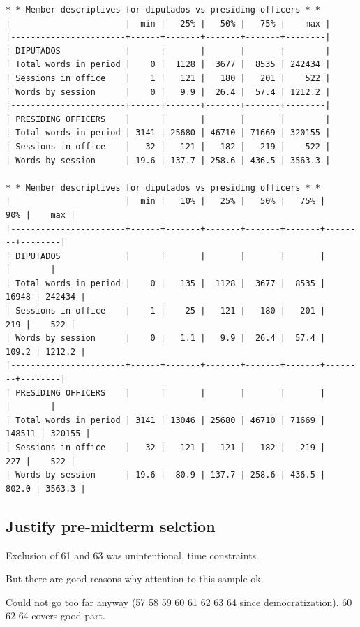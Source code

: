 \documentclass[letter,12pt]{article}
\begin{document}
\singlespacing
\begin{footnotesize}
\begin{verbatim}
* * Member descriptives for diputados vs presiding officers * *
|                       |  min |   25% |   50% |   75% |    max |
|-----------------------+------+-------+-------+-------+--------|
| DIPUTADOS             |      |       |       |       |        |
| Total words in period |    0 |  1128 |  3677 |  8535 | 242434 |
| Sessions in office    |    1 |   121 |   180 |   201 |    522 |
| Words by session      |    0 |   9.9 |  26.4 |  57.4 | 1212.2 |
|-----------------------+------+-------+-------+-------+--------|
| PRESIDING OFFICERS    |      |       |       |       |        |
| Total words in period | 3141 | 25680 | 46710 | 71669 | 320155 |
| Sessions in office    |   32 |   121 |   182 |   219 |    522 |
| Words by session      | 19.6 | 137.7 | 258.6 | 436.5 | 3563.3 |

* * Member descriptives for diputados vs presiding officers * *
|                       |  min |   10% |   25% |   50% |   75% |    90% |    max |
|-----------------------+------+-------+-------+-------+-------+--------+--------|
| DIPUTADOS             |      |       |       |       |       |        |        |
| Total words in period |    0 |   135 |  1128 |  3677 |  8535 |  16948 | 242434 |
| Sessions in office    |    1 |    25 |   121 |   180 |   201 |    219 |    522 |
| Words by session      |    0 |   1.1 |   9.9 |  26.4 |  57.4 |  109.2 | 1212.2 |
|-----------------------+------+-------+-------+-------+-------+--------+--------|
| PRESIDING OFFICERS    |      |       |       |       |       |        |        |
| Total words in period | 3141 | 13046 | 25680 | 46710 | 71669 | 148511 | 320155 |
| Sessions in office    |   32 |   121 |   121 |   182 |   219 |    227 |    522 |
| Words by session      | 19.6 |  80.9 | 137.7 | 258.6 | 436.5 |  802.0 | 3563.3 |

\end{verbatim}
\end{footnotesize}
\doublespacing


\subsection{Justify pre-midterm selction}

Exclusion of 61 and 63 was unintentional, time constraints.

But there are good reasons why attention to this sample ok.

Could not go too far anyway (57 58 59 60 61 62 63 64 since democratization). 60 62 64 covers good part.
\end{document}
